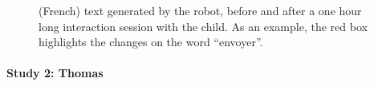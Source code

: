 \documentclass[10pt,a4paper]{article}
\begin{document}
\begin{figure}
    \centering

    \caption{\small (French) text generated by the robot, before and after a one
        hour long interaction session with the child. As an example, the red box
        highlights the changes on the word ``envoyer''.}

    \label{fig:stimuli}
\end{figure}

\paragraph{Study 2: Thomas}
\end{document}
